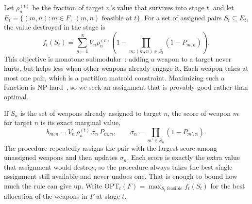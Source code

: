 Let $\rho_n^{(t)}$ be the fraction of target $n$'s value that survives into
stage $t$, and let $E_t = \{(m,n) : m \in F,\ (m,n) \text{ feasible at } t\}$.
For a set of assigned pairs $S_t \subseteq E_t$, the value destroyed in the
stage is
\begin{equation}
\label{eq:round-obj}
f_t(S_t) = \sum_{n=1}^N V_n\rho_n^{(t)}\left(1 - \!\!\prod_{m:(m,n)\in S_t}\!\!(1-P_{m,n})\right).
\end{equation}
This objective is monotone submodular~\cite{wang2013weapon}: adding a weapon
to a target never hurts, but helps less when other weapons already engage it.
Each weapon takes at most one pair, which is a partition matroid constraint.
Maximizing such a function is NP-hard~\cite{feige1998threshold}, so we seek an
assignment that is provably good rather than optimal.

If $S_n$ is the set of weapons already assigned to target $n$, the score of
weapon $m$ for target $n$ is its exact marginal value,
\begin{equation}
\label{eq:marginal-bid}
b_{m,n} = V_n\,\rho_n^{(t)}\,\sigma_n\,P_{m,n}, \qquad
\sigma_n = \prod_{m' \in S_n} (1 - P_{m',n}).
\end{equation}
The procedure repeatedly assigns the pair with the largest score among
unassigned weapons and then updates $\sigma_n$. Each score is exactly the extra
value that assignment would destroy, so the procedure always takes the best
single assignment still available and never undoes one. That is enough to
bound how much the rule can give up. Write
$\text{OPT}_t(F) = \max_{S_t \text{ feasible}} f_t(S_t)$ for the best
allocation of the weapons in $F$ at stage $t$.

